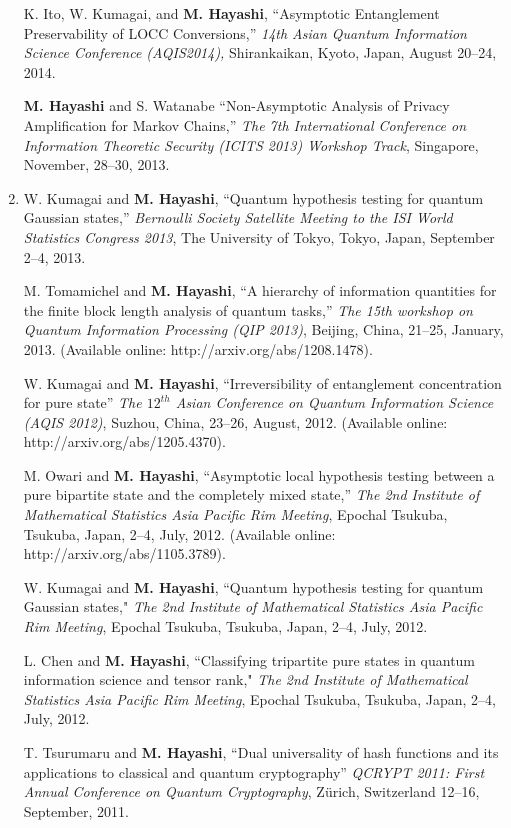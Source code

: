 \documentclass[a4paper,12pt,oneside]{article}
\begin{document}
\begin{enumerate}
K. Ito, W. Kumagai, and \textbf{M. Hayashi}, 
``Asymptotic Entanglement Preservability of LOCC Conversions,'' 
{\em 14th Asian Quantum Information Science Conference (AQIS2014),} Shirankaikan, Kyoto, Japan, August 20--24, 2014.

\textbf{M. Hayashi} and S. Watanabe
``Non-Asymptotic Analysis of Privacy Amplification for Markov Chains,''
{\em The 7th International Conference on Information Theoretic Security (ICITS 2013) Workshop Track},
Singapore, November, 28--30, 2013.

\item
W. Kumagai and \textbf{M. Hayashi}, 
``Quantum hypothesis testing for quantum Gaussian states,'' 
{\em Bernoulli Society Satellite Meeting to the ISI World Statistics Congress 2013}, 
The University of Tokyo, Tokyo, Japan,
September 2--4, 2013.

M. Tomamichel and \textbf{M. Hayashi}, ``A hierarchy of information quantities for the finite block length analysis of quantum tasks,''
{\em The 15th workshop on Quantum Information Processing (QIP 2013)}, Beijing, China, 21--25, January, 2013.
(Available online: http://arxiv.org/abs/1208.1478).

W. Kumagai and \textbf{M. Hayashi}, ``Irreversibility of entanglement concentration for pure state''
{\em The $12^{th}$ Asian Conference on Quantum Information Science (AQIS 2012)},
Suzhou, China, 23--26, August, 2012.
(Available online: http://arxiv.org/abs/1205.4370).

M. Owari and \textbf{M. Hayashi}, 
``Asymptotic local hypothesis testing between a pure bipartite state and the completely mixed state,''
{\em The 2nd Institute of Mathematical Statistics Asia Pacific Rim Meeting}, 
Epochal Tsukuba, Tsukuba, Japan, 2--4, July, 2012.
(Available online: http://arxiv.org/abs/1105.3789).

W. Kumagai and \textbf{M. Hayashi}, 
``Quantum hypothesis testing for quantum Gaussian states," 
{\em The 2nd Institute of Mathematical Statistics Asia Pacific Rim Meeting}, 
Epochal Tsukuba, Tsukuba, Japan, 2--4, July, 2012.

L. Chen and \textbf{M. Hayashi}, 
``Classifying tripartite pure states in quantum information science and tensor rank," 
{\em The 2nd Institute of Mathematical Statistics Asia Pacific Rim Meeting}, 
Epochal Tsukuba, Tsukuba, Japan, 2--4, July, 2012.

T. Tsurumaru and \textbf{M. Hayashi}, ``Dual universality of hash functions and its applications to classical and quantum cryptography'' 
{\em QCRYPT 2011: First Annual Conference on Quantum Cryptography}, 
Z\"{u}rich, Switzerland 12--16, September, 2011.


\end{enumerate}
\end{document}
